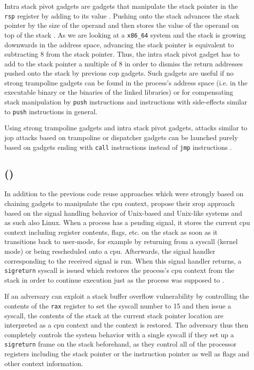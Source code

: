 Intra stack pivot gadgets are gadgets that manipulate the stack pointer in the \texttt{rsp} register by adding to its value \cite{Sadeghi2018}.
Pushing onto the stack advances the stack pointer by the size of the operand and then stores the value of the operand on top of the stack \cite[4-513\psq]{IntelCorporation2020}.
As we are looking at a \texttt{x86\_64} system and the stack is growing downwards in the address space, advancing the stack pointer is equivalent to subtracting 8 from the stack pointer.
Thus, the intra stack pivot gadget has to add to the stack pointer a multiple of 8 in order to dismiss the return addresses pushed onto the stack by previous \gls{cop} gadgets.
Such gadgets are useful if no strong trampoline gadgets can be found in the process's address space (i.e. in the executable binary or the binaries of the linked libraries) or for compensating stack manipulation by \texttt{push} instructions and instructions with side-effects similar to \texttt{push} instructions in general.

Using strong trampoline gadgets and intra stack pivot gadgets, attacks similar to \gls{jop} attacks based on trampoline or dispatcher gadgets can be launched purely based on gadgets ending with \texttt{call} instructions instead of \texttt{jmp} instructions \cite{Sadeghi2018}.

\subsection{ ()}
\label{subsec:cr-srop}

In addition to the previous code reuse approaches which were strongly based on chaining gadgets to manipulate the \acs{cpu} context, \citeauthor{Bosman2014} propose their \gls{srop} approach based on the signal handling behavior of Unix-based and Unix-like systems and as such also Linux.
When a process has a pending signal, it stores the current \acs{cpu} context including register contents, flags, etc. on the stack as soon as it transitions back to user-mode, for example by returning from a \gls{syscall} (kernel mode) or being rescheduled onto a \acs{cpu}.
Afterwards, the signal handler corresponding to the received signal is run.
When this signal handler returns, a \texttt{sigreturn} \gls{syscall} is issued which restores the process's \acs{cpu} context from the stack in order to continue execution just as the process was supposed to \cite{Bosman2014,Kerrisk2020a}.

If an adversary can exploit a stack buffer overflow vulnerability by controlling the contents of the \texttt{rax} register to set the \gls{syscall} number to 15 \cite[\texttt{arch/x86/entry/\linebreak[0]syscalls/syscall\_64.tbl}]{LKD2020} and then issue a \gls{syscall}, the contents of the stack at the current stack pointer location are interpreted as a \acs{cpu} context and the context is restored.
The adversary thus then completely controls the system behavior with a single \gls{syscall} if they set up a \texttt{sigreturn} frame on the stack beforehand, as they control all of the processor registers including the stack pointer or the instruction pointer as well as flags and other context information.

